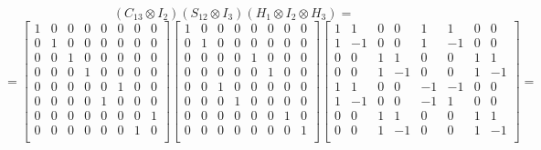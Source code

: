 \documentclass{../notatki}
\begin{document}
$$
(C_{13} \otimes I_2)(S_{12} \otimes I_3)(H_1 \otimes I_2 \otimes H_3) =
$$
$$
=
\begin{bmatrix}
  1 & 0 & 0 & 0 & 0 & 0 & 0 & 0 \\
  0 & 1 & 0 & 0 & 0 & 0 & 0 & 0 \\
  0 & 0 & 1 & 0 & 0 & 0 & 0 & 0 \\
  0 & 0 & 0 & 1 & 0 & 0 & 0 & 0 \\
  0 & 0 & 0 & 0 & 0 & 1 & 0 & 0 \\
  0 & 0 & 0 & 0 & 1 & 0 & 0 & 0 \\
  0 & 0 & 0 & 0 & 0 & 0 & 0 & 1 \\
  0 & 0 & 0 & 0 & 0 & 0 & 1 & 0 \\
\end{bmatrix}
\begin{bmatrix}
  1 & 0 & 0 & 0 & 0 & 0 & 0 & 0 \\
  0 & 1 & 0 & 0 & 0 & 0 & 0 & 0 \\
  0 & 0 & 0 & 0 & 1 & 0 & 0 & 0 \\
  0 & 0 & 0 & 0 & 0 & 1 & 0 & 0 \\
  0 & 0 & 1 & 0 & 0 & 0 & 0 & 0 \\
  0 & 0 & 0 & 1 & 0 & 0 & 0 & 0 \\
  0 & 0 & 0 & 0 & 0 & 0 & 1 & 0 \\
  0 & 0 & 0 & 0 & 0 & 0 & 0 & 1 \\
\end{bmatrix}
\begin{bmatrix}
  1 & 1 & 0 & 0 & 1 & 1 & 0 & 0 \\
  1 & -1 & 0 & 0 & 1 & -1 & 0 & 0 \\
  0 & 0 & 1 & 1 & 0 & 0 & 1 & 1 \\
  0 & 0 & 1 & -1 & 0 & 0 & 1 & -1 \\
  1 & 1 & 0 & 0 & -1 & -1 & 0 & 0 \\
  1 & -1 & 0 & 0 & -1 & 1 & 0 & 0 \\
  0 & 0 & 1 & 1 & 0 & 0 & 1 & 1 \\
  0 & 0 & 1 & -1 & 0 & 0 & 1 & -1 \\
\end{bmatrix}=
$$
\end{document}

